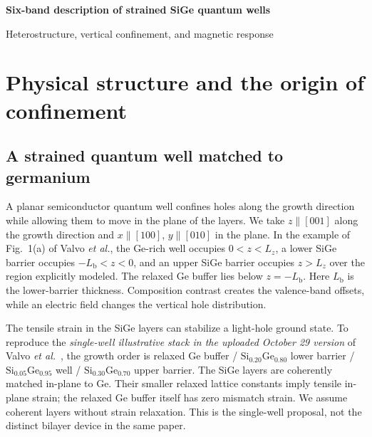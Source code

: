 \documentclass[10pt,letterpaper]{article}
\begin{document}
\thispagestyle{empty}
\begin{center}
{\large\bfseries Six-band description of strained SiGe quantum wells}\par
\vspace{11pt}
Heterostructure, vertical confinement, and magnetic response
\end{center}
\vspace{20pt}
\hypersetup{linkcolor=black}
\tableofcontents
\hypersetup{linkcolor=blue}
\vspace{23pt}
\clearpage

\section{Physical structure and the origin of confinement}
\label{sec:device}

\subsection{A strained quantum well matched to germanium}

A planar semiconductor quantum well confines holes along the growth direction while allowing them to move in the plane of the layers. We take $z\parallel[001]$ along the growth direction and $x\parallel[100]$, $y\parallel[010]$ in the plane. In the example of Fig.~1(a) of Valvo \emph{et al.}, the Ge-rich well occupies $0<z<L_z$, a lower SiGe barrier occupies $-L_{\mathrm b}<z<0$, and an upper SiGe barrier occupies $z>L_z$ over the region explicitly modeled. The relaxed Ge buffer lies below $z=-L_{\mathrm b}$. Here $L_{\mathrm b}$ is the lower-barrier thickness. Composition contrast creates the valence-band offsets, while an electric field changes the vertical hole distribution.

The tensile strain in the SiGe layers can stabilize a light-hole ground state. To reproduce the \emph{single-well illustrative stack in the uploaded October 29 version} of Valvo \emph{et al.}~\cite{valvo}, the growth order is relaxed Ge buffer / $\mathrm{Si}_{0.20}\mathrm{Ge}_{0.80}$ lower barrier / $\mathrm{Si}_{0.05}\mathrm{Ge}_{0.95}$ well / $\mathrm{Si}_{0.30}\mathrm{Ge}_{0.70}$ upper barrier. The SiGe layers are coherently matched in-plane to Ge. Their smaller relaxed lattice constants imply tensile in-plane strain; the relaxed Ge buffer itself has zero mismatch strain. We assume coherent layers without strain relaxation. This is the single-well proposal, not the distinct bilayer device in the same paper.
\end{document}
